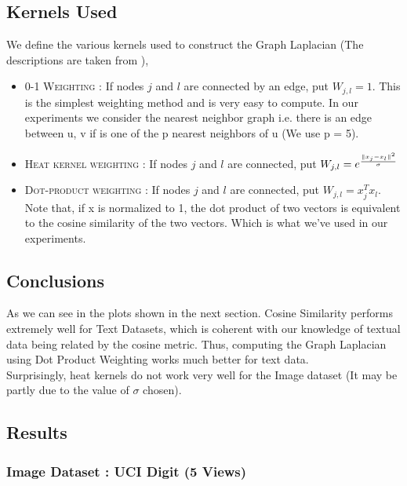 \documentclass[a4paper]{article}
\begin{document}
	\subsection{Kernels Used}

	We define the various kernels used to construct the Graph Laplacian (The descriptions are taken from \cite{GReg}),
	\begin{itemize}
	\item \textsc{0-1 Weighting :} If nodes $j$ and $l$ are connected by an edge, put $W_{j,l} = 1$. This is the simplest weighting method and is very easy to compute. In our experiments we consider the nearest neighbor graph i.e. there is an edge between u, v if is one of the p nearest neighbors of u (We use p = 5).
	\item \textsc{Heat kernel weighting :} If nodes $j$ and $l$ are connected, put $W_{j,l} = e^{\frac{\|x_{j}-x_{l}\|^{\text{\tiny{2}}}}{\sigma}}$
	\item \textsc{Dot-product weighting :} If nodes $j$ and $l$ are connected, put $W_{j,l} = x^{T}_{j}x_{l}$. Note that, if x is normalized to 1, the dot product of two vectors is equivalent to the cosine similarity of the two vectors. Which is what we've used in our experiments.
	
	\end{itemize}	

	\subsection{Conclusions}

	As we can see in the plots shown in the next section. Cosine Similarity performs extremely well for Text Datasets, which is coherent with our knowledge of textual data being related by the cosine metric. Thus, computing the Graph Laplacian using Dot Product Weighting works much better for text data.\\
	Surprisingly, heat kernels do not work very well for the Image dataset (It may be partly due to the value of $\sigma$ chosen).\\

	\pagebreak
	
	
	\subsection{Results}
	
	\subsubsection{Image Dataset : UCI Digit (5 Views)}
\end{document}
